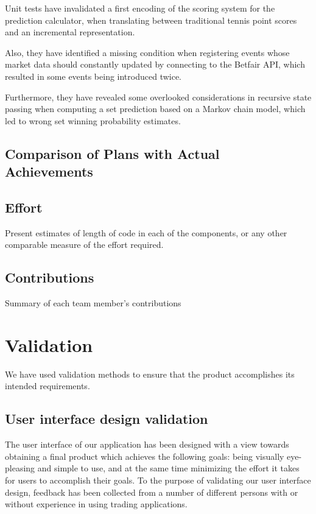 \documentclass[10pt]{report}
\begin{document}
Unit tests have invalidated a first encoding of the scoring system for the prediction calculator, when translating between traditional tennis point scores and an incremental representation.

Also, they have identified a missing condition when registering events whose market data should constantly updated by connecting to the Betfair API, which resulted in some events being introduced twice.

Furthermore, they have revealed some overlooked considerations in recursive state passing when computing a set prediction based on a Markov chain model, which led to wrong set winning probability estimates. 

\clearpage

\section{Comparison of Plans with Actual Achievements }

\section{Effort}
Present estimates of length of code in each of the components, or any other comparable measure of the effort required.

\section{Contributions}
Summary of each team member's contributions 


\chapter{Validation}

We have used validation methods to ensure that the product accomplishes its intended requirements.

\section{User interface design validation}
The user interface of our application has been designed with a view towards
obtaining a final product which achieves the following goals: being visually
eye-pleasing and simple to use, and at the same time minimizing the effort it
takes for users to accomplish their goals. To the purpose of validating our user
interface design, feedback has been collected from a number of different persons
with or without experience in using trading applications.
\end{document}
